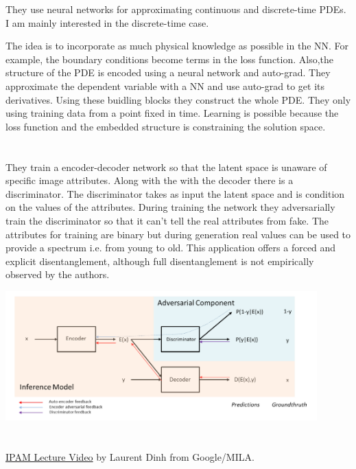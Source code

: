 \documentclass{article}
\newcommand{\citeall}[1]{\citeauthor{#1}}
\begin{document}
They use neural networks for approximating continuous and discrete-time PDEs. I am mainly interested in the discrete-time case. 

The idea is to incorporate as much physical knowledge as possible in the NN. For example, the boundary conditions become terms in the loss function. Also,the structure of the PDE is encoded using a neural network and auto-grad. They approximate the dependent variable with a NN and use auto-grad to get its derivatives. Using these buidling blocks they construct the whole PDE. They only using training data from a point fixed in time. Learning is possible because the loss function and the embedded structure is constraining the solution space.

\section{\citeall{Lample2017FaderAttributes}}

They train a encoder-decoder network so that the latent space is unaware of specific image attributes. Along with the with the decoder there is a discriminator. The discriminator takes as input the latent space and is condition on the values of the attributes. During training the network they adversarially train the discriminator so that it can't tell the real attributes from fake. The attributes for training are binary but during generation real values can be used to provide a spectrum i.e. from young to old. This application offers a forced and explicit disentanglement, although full disentanglement is not empirically observed by the authors. 

\includegraphics[width=0.9\textwidth]{images/fader-net.png}

\section{\citeall{Rezende2015VariationalFlows}}

\href{http://www.ipam.ucla.edu/abstract/?tid=16242&pcode=MLPWS1
}{IPAM Lecture Video} by Laurent Dinh from Google/MILA.
\end{document}
